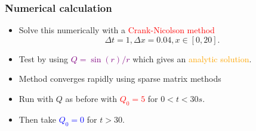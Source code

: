 \documentclass{beamer}
\begin{document}
\begin{frame}
\frametitle{Numerical calculation}
\begin{itemize}

\item Solve this numerically with a \textcolor{red}{Crank-Nicolson method}
$$\Delta t = 1, \Delta x = 0.04, x \in [0,20].$$

\item Test by using \textcolor{purple}{$Q = \sin(r)/r$} which gives an \textcolor{orange}{analytic solution}.

\item Method converges rapidly using sparse matrix methods

\item Run with $Q$ as before with \textcolor{red}{$Q_0 = 5$} for $0 < t < 30s$. 

\item Then take \textcolor{blue}{$Q_0 = 0$} for $t > 30$.

\end{itemize}

\end{frame}
\end{document}
